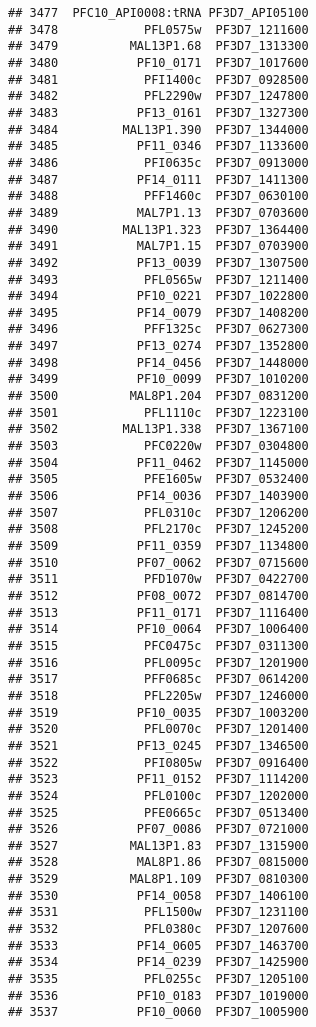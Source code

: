 \documentclass{article}\usepackage[]{graphicx}\usepackage[]{color}
\makeatletter
\newenvironment{kframe}{%
 \def\at@end@of@kframe{}%
 \ifinner\ifhmode%
  \def\at@end@of@kframe{\end{minipage}}%
  \begin{minipage}{\columnwidth}%
 \fi\fi%
 \def\FrameCommand##1{\hskip\@totalleftmargin \hskip-\fboxsep
 \colorbox{shadecolor}{##1}\hskip-\fboxsep
     \hskip-\linewidth \hskip-\@totalleftmargin \hskip\columnwidth}%
 \MakeFramed {\advance\hsize-\width
   \@totalleftmargin\z@ \linewidth\hsize
   \@setminipage}}%
 {\par\unskip\endMakeFramed%
 \at@end@of@kframe}
\newenvironment{knitrout}{}{} %
\makeatother
\begin{document}
\begin{knitrout}
\begin{kframe}
\begin{verbatim}
## 3477  PFC10_API0008:tRNA PF3D7_API05100
## 3478            PFL0575w  PF3D7_1211600
## 3479          MAL13P1.68  PF3D7_1313300
## 3480           PF10_0171  PF3D7_1017600
## 3481            PFI1400c  PF3D7_0928500
## 3482            PFL2290w  PF3D7_1247800
## 3483           PF13_0161  PF3D7_1327300
## 3484         MAL13P1.390  PF3D7_1344000
## 3485           PF11_0346  PF3D7_1133600
## 3486            PFI0635c  PF3D7_0913000
## 3487           PF14_0111  PF3D7_1411300
## 3488            PFF1460c  PF3D7_0630100
## 3489           MAL7P1.13  PF3D7_0703600
## 3490         MAL13P1.323  PF3D7_1364400
## 3491           MAL7P1.15  PF3D7_0703900
## 3492           PF13_0039  PF3D7_1307500
## 3493            PFL0565w  PF3D7_1211400
## 3494           PF10_0221  PF3D7_1022800
## 3495           PF14_0079  PF3D7_1408200
## 3496            PFF1325c  PF3D7_0627300
## 3497           PF13_0274  PF3D7_1352800
## 3498           PF14_0456  PF3D7_1448000
## 3499           PF10_0099  PF3D7_1010200
## 3500          MAL8P1.204  PF3D7_0831200
## 3501            PFL1110c  PF3D7_1223100
## 3502         MAL13P1.338  PF3D7_1367100
## 3503            PFC0220w  PF3D7_0304800
## 3504           PF11_0462  PF3D7_1145000
## 3505            PFE1605w  PF3D7_0532400
## 3506           PF14_0036  PF3D7_1403900
## 3507            PFL0310c  PF3D7_1206200
## 3508            PFL2170c  PF3D7_1245200
## 3509           PF11_0359  PF3D7_1134800
## 3510           PF07_0062  PF3D7_0715600
## 3511            PFD1070w  PF3D7_0422700
## 3512           PF08_0072  PF3D7_0814700
## 3513           PF11_0171  PF3D7_1116400
## 3514           PF10_0064  PF3D7_1006400
## 3515            PFC0475c  PF3D7_0311300
## 3516            PFL0095c  PF3D7_1201900
## 3517            PFF0685c  PF3D7_0614200
## 3518            PFL2205w  PF3D7_1246000
## 3519           PF10_0035  PF3D7_1003200
## 3520            PFL0070c  PF3D7_1201400
## 3521           PF13_0245  PF3D7_1346500
## 3522            PFI0805w  PF3D7_0916400
## 3523           PF11_0152  PF3D7_1114200
## 3524            PFL0100c  PF3D7_1202000
## 3525            PFE0665c  PF3D7_0513400
## 3526           PF07_0086  PF3D7_0721000
## 3527          MAL13P1.83  PF3D7_1315900
## 3528           MAL8P1.86  PF3D7_0815000
## 3529          MAL8P1.109  PF3D7_0810300
## 3530           PF14_0058  PF3D7_1406100
## 3531            PFL1500w  PF3D7_1231100
## 3532            PFL0380c  PF3D7_1207600
## 3533           PF14_0605  PF3D7_1463700
## 3534           PF14_0239  PF3D7_1425900
## 3535            PFL0255c  PF3D7_1205100
## 3536           PF10_0183  PF3D7_1019000
## 3537           PF10_0060  PF3D7_1005900

\end{verbatim}
\end{kframe}
\end{knitrout}
\end{document}
